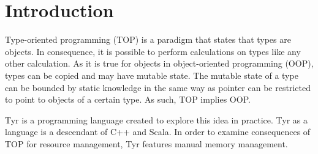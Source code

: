 
\section{Introduction}

Type-oriented programming (TOP) is a paradigm that states that types are objects.
In consequence, it is possible to perform calculations on types like any other calculation.
As it is true for objects in object-oriented programming (OOP), types can be copied and may have mutable state.
The mutable state of a type can be bounded by static knowledge in the same way as pointer can be restricted to point to objects of a certain type.
As such, TOP implies OOP.

Tyr is a programming language created to explore this idea in practice.
Tyr as a language is a descendant of C++ and Scala.
In order to examine consequences of TOP for resource management, Tyr features manual memory management.